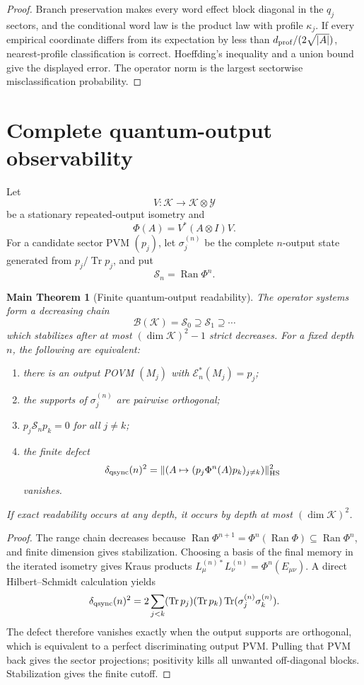 \documentclass[11pt,oneside,openany]{book}
\numberwithin{equation}{chapter}
\newtheorem{maintheorem}[theorem]{Main Theorem}
\theoremstyle{definition}
\theoremstyle{remark}
\newcommand{\Tr}{\operatorname{Tr}}
\newcommand{\Ran}{\operatorname{Ran}}
\newcommand{\HS}{\mathrm{HS}}
\newcommand{\norm}[1]{\lVert #1\rVert}
\begin{document}
\begin{proof}
Branch preservation makes every word effect block diagonal in the \(q_j\)
sectors, and the conditional word law is the product law with profile
\(\kappa_j\).  If every empirical coordinate differs from its expectation by
less than \(d_{\rm prof}/(2\sqrt{|A|})\), nearest-profile classification is
correct.  Hoeffding's inequality and a union bound give the displayed error.
The operator norm is the largest sectorwise misclassification probability.
\end{proof}

\section{Complete quantum-output observability}

Let
\[
 V:\mathcal K\to\mathcal K\otimes\mathcal Y
\]
be a stationary repeated-output isometry and
\[
 \Phi(A)=V^*(A\otimes I)V.
\]
For a candidate sector PVM \((p_j)\), let \(\sigma_j^{(n)}\) be the complete
\(n\)-output state generated from \(p_j/\Tr p_j\), and put
\[
 \mathcal S_n=\Ran\Phi^n.
\]

\begin{maintheorem}[Finite quantum-output readability]
\label{thm:v6-quantum-readability}
The operator systems form a decreasing chain
\[
 \mathcal B(\mathcal K)=\mathcal S_0
 \supseteq\mathcal S_1\supseteq\cdots
\]
which stabilizes after at most \((\dim\mathcal K)^2-1\) strict decreases.  For
a fixed depth \(n\), the following are equivalent:
\begin{enumerate}[label=\textup{(\roman*)},leftmargin=2.8em]
\item there is an output POVM \((M_j)\) with
      \(\mathcal E_n^*(M_j)=p_j\);
\item the supports of \(\sigma_j^{(n)}\) are pairwise orthogonal;
\item \(p_j\mathcal S_np_k=0\) for all \(j\ne k\);
\item the finite defect
      \[
       \delta_{\rm qsync}(n)^2
       =\norm{(A\mapsto(p_j\Phi^n(A)p_k)_{j\ne k})}_{\HS}^2
      \]
      vanishes.
\end{enumerate}
If exact readability occurs at any depth, it occurs by depth at most
\((\dim\mathcal K)^2\).
\end{maintheorem}

\begin{proof}
The range chain decreases because
\(\Ran\Phi^{n+1}=\Phi^n(\Ran\Phi)\subseteq\Ran\Phi^n\), and finite dimension
gives stabilization.  Choosing a basis of the final memory in the iterated
isometry gives Kraus products
\(L_\mu^{(n)*}L_\nu^{(n)}=\Phi^n(E_{\mu\nu})\).  A direct Hilbert--Schmidt
calculation yields
\[
 \delta_{\rm qsync}(n)^2
 =2\sum_{j<k}(\Tr p_j)(\Tr p_k)
 \Tr(\sigma_j^{(n)}\sigma_k^{(n)}).
\]
The defect therefore vanishes exactly when the output supports are orthogonal,
which is equivalent to a perfect discriminating output PVM.  Pulling that PVM
back gives the sector projections; positivity kills all unwanted off-diagonal
blocks.  Stabilization gives the finite cutoff.
\end{proof}
\end{document}
